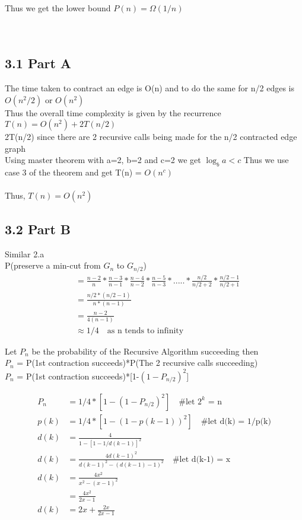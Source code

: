 \documentclass[12pt]{article}
\begin{document}
Thus we get the lower bound \(P(n)=\Omega( 1/n)\)
\\~\\~\\
\subsection*{3.1 Part A} 

\vspace{10pt}
The time taken to contract an edge is O(n) and to do the same for n/2 edges is \(O(n^2/2)\) or \(O(n^2)\) \\
Thus the overall time complexity is given by the recurrence \\ 
\(T(n) = O(n^2) + 2T(n/2)\) \\ 
2T(n/2) since there are 2 recursive calls being made for the n/2 contracted edge graph \\ 
Using master theorem with a=2, b=2 and c=2 we get \(\log_{b}a < c\) Thus we use case 3 of the theorem and get T(n) = \(O(n^c)\) \\~\\
Thus, \(T(n)=O(n^2)\) 

\subsection*{3.2 Part B} 

\vspace{10pt}
Similar 2.a \\
P(preserve a min-cut from \(G_n\) to \(G_{n/2}\)) \\ 
\begin{align*}
 &= \frac{n-2}{n} * \frac{n-3}{n-1} * \frac{n-4}{n-2} * \frac{n-5}{n-3} * ..... * \frac{n/2}{n/2+2} * \frac{n/2-1}{n/2+1}  \\
 &= \frac{n/2*(n/2-1)}{n*(n-1)} \\
 &= \frac{n-2}{4(n-1)} \\
 &\approx 1/4 \quad \text{as n tends to infinity}
\end{align*}

Let \(P_n\) be the probability of the Recursive Algorithm succeeding then \\ 
\(P_n\) = P(1st contraction succeeds)*P(The 2 recursive calls succeeding) \\
\(P_n\) = P(1st contraction succeeds)*[1-\((1-P_{n/2})^2\)] 

\begin{align*}
    P_n &= 1/4*[1-(1-P_{n/2})^2] \quad \text{\# let \(2^k\) = n} \\ 
    p(k) &= 1/4*[1-(1-p(k-1))^2] \quad \text{\# let d(k) = 1/p(k)} \\
    d(k) &= \frac{4}{1-[1-1/d(k-1)]^2} \\
    d(k) &= \frac{4d(k-1)^2}{d(k-1)^2-(d(k-1)-1)^2} \quad \text{\# let d(k-1) = x} \\
    d(k) &= \frac{4x^2}{x^2-(x-1)^2} \\
    &= \frac{4x^2}{2x-1} \\
    d(k) &= 2x + \frac{2x}{2x-1}
 \end{align*}
\end{document}
